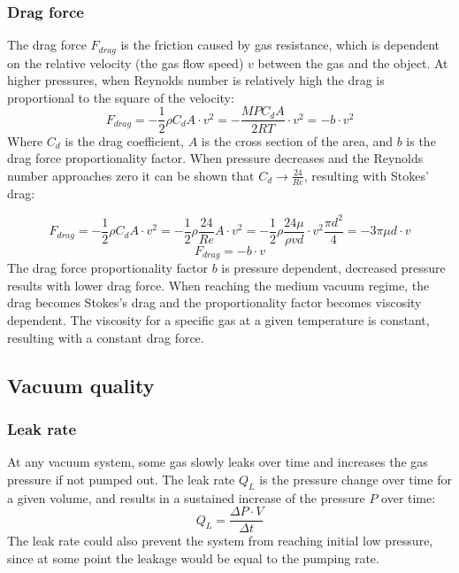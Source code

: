 \documentclass[\main/master.tex]{subfiles}
\begin{document}
\subsubsection{Drag force}
The drag force $F_{drag}$ is the friction caused by gas resistance, which is dependent on the relative velocity (the gas flow speed) $v$ between the gas and the object. At higher pressures, when Reynolds number is relatively high the drag is proportional to the square of the velocity:
\begin{equation}
F_{drag} = -\frac{1}{2}\rho C_d A\cdot v^2 = -\frac{M P C_d A}{2RT}\cdot v^2= -b\cdot v^2 
\label{eqn:drag force}
\end{equation}
Where $C_d$ is the drag coefficient, $A$ is the cross section of the area, and $b$ is the drag force proportionality factor. When pressure decreases and the Reynolds number approaches zero it can be shown that $C_d \rightarrow \frac{24}{Re}$, resulting with Stokes' drag:

\begin{equation}
F_{drag} = -\frac{1}{2}\rho C_d A\cdot v^2  = -\frac{1}{2}\rho \frac{24}{Re} A\cdot v^2 = -\frac{1}{2}\rho \frac{24\mu}{\rho v d}\cdot v^2 \frac{\pi d^2}{4} = -3\pi\mu d\cdot v
\label{eqn:drag_force_low}
\end{equation}
\begin{equation}
F_{drag} = - b \cdot v
\label{eqn:drag_force_low_final}
\end{equation}
The drag force proportionality factor $b$ is pressure dependent, decreased pressure results with lower drag force. When reaching the medium vacuum regime, the drag becomes Stokes's drag and the proportionality factor becomes viscosity dependent. The viscosity for a specific gas at a given temperature is constant, resulting with a constant drag force.


\subsection{Vacuum quality}
\subsubsection{Leak rate}
At any vacuum system, some gas slowly leaks over time and increases the gas pressure if not pumped out. The leak rate $Q_L$ is the pressure change over time for a given volume, and results in a sustained increase of the pressure $P$ over time:
\begin{equation}
Q_L = \frac{\Delta P\cdot V}{\Delta t}  \label{eqn:leak rate}
\end{equation}
The leak rate could also prevent the system from reaching initial low pressure, since at some point the leakage would be equal to the pumping rate.
\par\noindent
\end{document}
